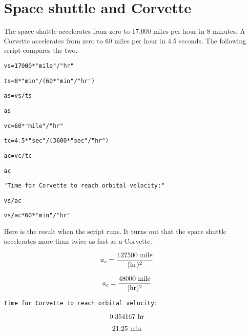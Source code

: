 \section*{Space shuttle and Corvette}

The space shuttle accelerates from zero to 17{,}000 miles per hour
in 8 minutes.
A Corvette accelerates from zero to 60 miles per hour in 4.5 seconds.
The following script compares the two.

\medskip
\verb$vs=17000*"mile"/"hr"$

\verb$ts=8*"min"/(60*"min"/"hr")$

\verb$as=vs/ts$

\verb$as$

\verb$vc=60*"mile"/"hr"$

\verb$tc=4.5*"sec"/(3600*"sec"/"hr")$

\verb$ac=vc/tc$

\verb$ac$

\verb$"Time for Corvette to reach orbital velocity:"$

\verb$vs/ac$

\verb$vs/ac*60*"min"/"hr"$

\medskip
\noindent
Here is the result when the script runs.
It turns out that the space shuttle accelerates more than twice as fast as a
Corvette.

\medskip
$$a_s={\hbox{127500 mile}\over(\hbox{hr})^2}$$

$$a_c={\hbox{48000 mile}\over(\hbox{hr})^2}$$

\verb$Time for Corvette to reach orbital velocity:$

$$\hbox{0.354167 hr}$$

$$\hbox{21.25 min}$$

